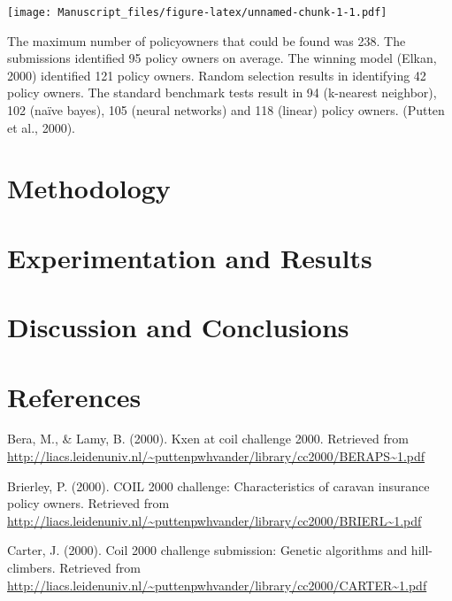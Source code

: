 \documentclass[man]{apa6}
\begin{document}
\texttt{[image: Manuscript\_files/figure-latex/unnamed-chunk-1-1.pdf]}

The maximum number of policyowners that could be found was 238. The submissions identified 95 policy owners on average. The winning model (Elkan, 2000) identified 121 policy owners. Random selection results in identifying 42 policy owners. The standard benchmark tests result in 94 (k-nearest neighbor), 102 (naïve bayes), 105 (neural networks) and 118 (linear) policy owners. (Putten et al., 2000).

\hypertarget{methodology}{%
\section{Methodology}\label{methodology}}

\hypertarget{experimentation-and-results}{%
\section{Experimentation and Results}\label{experimentation-and-results}}

\hypertarget{discussion-and-conclusions}{%
\section{Discussion and Conclusions}\label{discussion-and-conclusions}}

\newpage

\hypertarget{references}{%
\section{References}\label{references}}

\begingroup
\setlength{\parindent}{-0.5in}
\setlength{\leftskip}{0.5in}

\hypertarget{refs}{}
\leavevmode\hypertarget{ref-Bera}{}%
Bera, M., \& Lamy, B. (2000). Kxen at coil challenge 2000. Retrieved from \url{http://liacs.leidenuniv.nl/~puttenpwhvander/library/cc2000/BERAPS~1.pdf}

\leavevmode\hypertarget{ref-Brierley}{}%
Brierley, P. (2000). COIL 2000 challenge: Characteristics of caravan insurance policy owners. Retrieved from \url{http://liacs.leidenuniv.nl/~puttenpwhvander/library/cc2000/BRIERL~1.pdf}

\leavevmode\hypertarget{ref-Carter}{}%
Carter, J. (2000). Coil 2000 challenge submission: Genetic algorithms and hill-climbers. Retrieved from \url{http://liacs.leidenuniv.nl/~puttenpwhvander/library/cc2000/CARTER~1.pdf}
\end{document}
